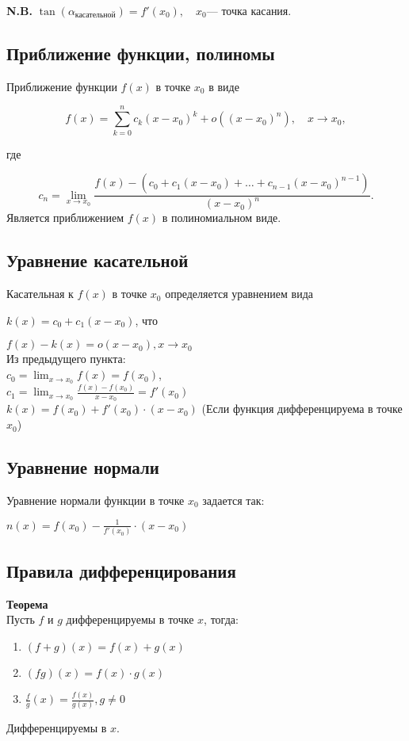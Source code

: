 \textbf{N.B.} \( \tan (\alpha_\text{касательной}) = f'(x_0), \quad x_0 \text{--- точка касания.} \)

\subsection{Приближение функции, полиномы}

Приближение функции \( f(x) \) в точке \( x_0 \) в виде

\[
f(x) = \sum_{k=0}^{n} c_k (x - x_0)^k + o((x - x_0)^n), \quad x \to x_0,
\]

где 

\[
c_n = \lim_{x \to x_0} \frac{f(x) - \left( c_0 + c_1 (x - x_0) + \dots + c_{n-1} (x - x_0)^{n-1} \right)}{(x - x_0)^n}.
\]
Является приближением $f(x)$ в полиномиальном виде.

\subsection{Уравнение касательной}
Касательная к $f(x)$ в точке $x_0$ определяется уравнением вида
\begin{center}
    \(k(x) = c_0 + c_1(x-x_0)\), что\\
\end{center}
\(f(x) - k(x) = o(x-x_0), x \to x_0 \)\\

Из предыдущего пункта:\\ 
\(c_0 = \lim_{x \to x_0} f(x) = f(x_0) \),\\ 
\(c_1 = \lim_{x \to x_0} \frac{f(x) - f(x_0)}{x-x_0} = f'(x_0)\)\\
\(k(x) = f(x_0) + f'(x_0) \cdot (x-x_0)\) (Если функция дифференцируема в точке $x_0$)


\subsection{Уравнение нормали}
Уравнение нормали функции в точке $x_0$ задается так: 
\begin{center}
    \(   n(x) = f(x_0) - \frac{1}{f'(x_0)} \cdot (x-x_0)  \)
\end{center}

\subsection{Правила дифференцирования}

\textbf{Теорема}\\
Пусть \(f \text{ и } g \text{ дифференцируемы в точке } x\), тогда:\\
\begin{enumerate}
    \item \((f+g)(x) = f(x) + g(x)\)
    \item \((fg) (x) = f(x) \cdot g(x)\)
    \item \( \frac{f}{g}(x) = \frac{f(x)}{g(x)}, g \ne 0  \)
\end{enumerate}
Дифференцируемы в $x$.

